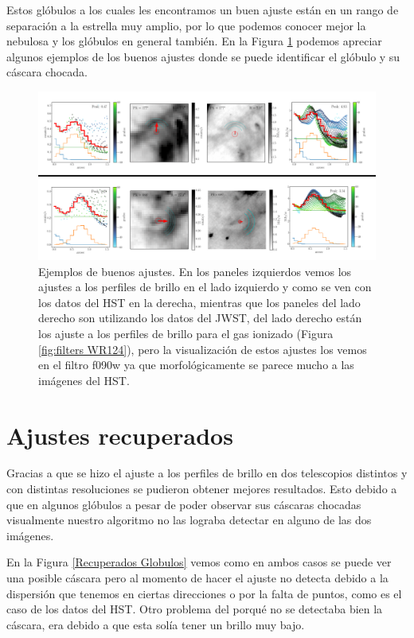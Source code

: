 \documentclass{book}
\begin{document}
Estos glóbulos a los cuales les encontramos un buen ajuste están en un rango de separación a la estrella muy amplio, por lo que podemos conocer mejor la nebulosa y los glóbulos en general también. En la Figura \ref{Goog G} podemos apreciar algunos ejemplos de los buenos ajustes donde se puede identificar el glóbulo y su cáscara chocada.

\begin{figure}[htb]
    \centering
    \includegraphics[width=\textwidth]{Nuevas imagenes finales/C4_Buenos_ajustes_.pdf}
    \caption{Ejemplos de buenos ajustes. En los paneles izquierdos vemos los ajustes a los perfiles de brillo en el lado izquierdo y como se ven con los datos del HST en la derecha, mientras que los paneles del lado derecho son utilizando los datos del JWST, del lado derecho están  los ajuste a los perfiles de brillo para el gas ionizado (Figura \ref{fig:filters WR124}), pero la visualización de estos ajustes los vemos en el filtro f090w ya que morfológicamente se parece mucho a las imágenes del HST.}
    \label{Goog G}
\end{figure}

\section{Ajustes recuperados}

Gracias a que se hizo el ajuste a los perfiles de brillo en dos telescopios distintos y con distintas resoluciones se pudieron obtener mejores resultados. Esto debido a que en algunos glóbulos a pesar de poder observar sus cáscaras chocadas visualmente nuestro algoritmo no las lograba detectar en alguno de las dos imágenes. 

En la Figura \ref{Recuperados Globulos} vemos como en  ambos casos se puede ver una posible cáscara pero al momento de hacer el ajuste no detecta debido a la dispersión que tenemos en ciertas direcciones o por la falta de puntos, como es el caso de los datos del HST. Otro problema del porqué no se detectaba bien la cáscara, era debido a que esta solía tener un brillo muy bajo.
\end{document}
